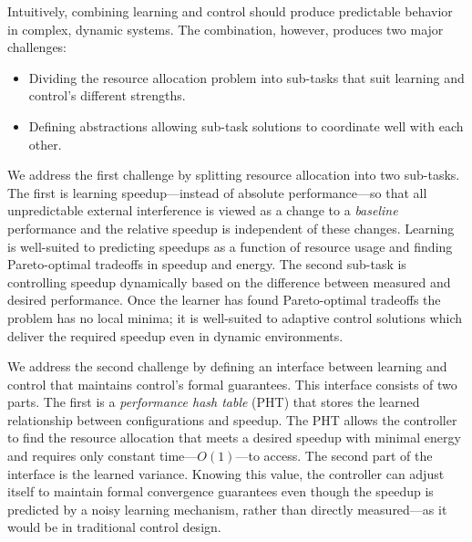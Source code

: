 Intuitively, combining learning and control should produce predictable
behavior in complex, dynamic systems.  The combination, however,
produces two major challenges:
\begin{itemize}[leftmargin=1em]
\item Dividing the resource allocation problem into sub-tasks that
  suit learning and control's different strengths.
\item Defining abstractions allowing sub-task solutions to coordinate
  well with each other.
\end{itemize}

We address the first challenge by splitting resource allocation into
two sub-tasks.  The first is learning speedup---instead of absolute
performance---so that all unpredictable external interference is
viewed as a change to a \emph{baseline} performance and the relative
speedup is independent of these changes.  Learning is well-suited to
predicting speedups as a function of resource usage and finding
Pareto-optimal tradeoffs in speedup and energy.  The second sub-task
is controlling speedup dynamically based on the difference between
measured and desired performance.  Once the learner has found
Pareto-optimal tradeoffs the problem has no local minima; it is
well-suited to adaptive control solutions which deliver the required
speedup even in dynamic environments.

We address the second challenge by defining an interface between
learning and control that maintains control's formal guarantees.  This
interface consists of two parts.  The first is a \emph{performance
  hash table} (PHT) that stores the learned relationship between
configurations and speedup.  The PHT allows the controller to find the
resource allocation that meets a desired speedup with minimal energy
and requires only constant time---$O(1)$---to access.  The second part
of the interface is the learned variance.  Knowing this value, the
controller can adjust itself to maintain formal convergence guarantees
even though the speedup is predicted by a noisy learning mechanism,
rather than directly measured---as it would be in traditional control
design.

